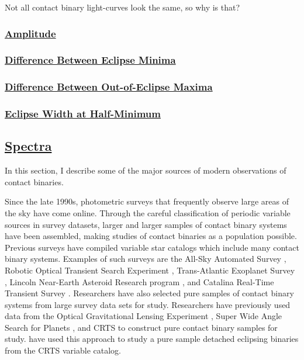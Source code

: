 \documentclass[12pt]{article} %
\numberwithin{equation}{section} %
\begin{document}
Not all contact binary light-curves look the same, so why is that?

\subsubsection[Amplitude]{\hyperlink{toc}{Amplitude}} \label{sec: Amplitude}

\subsubsection[Difference Between Eclipse Minima]{\hyperlink{toc}{Difference Between Eclipse Minima}} \label{sec: Difference Between Eclipse Minima}

\subsubsection[Difference Between Out-of-Eclipse Maxima]{\hyperlink{toc}{Difference Between Out-of-Eclipse Maxima}} \label{sec: Difference Between Out-of-Eclipse Maxima}

\subsubsection[Eclipse Width at Half-Minimum]{\hyperlink{toc}{Eclipse Width at Half-Minimum}} \label{sec: Eclipse Width at Half-Minimum}

\subsection[Spectra]{\hyperlink{toc}{Spectra}} \label{sec: Spectra}

In this section, I describe some of the major sources of modern observations of contact binaries. 

Since the late 1990s, photometric surveys that frequently observe large areas of the sky have come online. Through the careful classification of periodic variable sources in survey datasets, larger and larger samples of contact binary systems have been assembled, making studies of contact binaries as a population possible. Previous surveys have compiled variable star catalogs which include many contact binary systems. Examples of such surveys are the All-Sky Automated Survey \citep[ASAS,][]{pojmanski2000all}, Robotic Optical Transient Search Experiment \citep[ROTSE,][]{akerlof2000rotse}, Trans-Atlantic Exoplanet Survey \citep[TrES,][]{devor2008identification}, Lincoln Near-Earth Asteroid Research program \citep[LINEAR,][]{palaversa2013exploring}, and Catalina Real-Time Transient Survey \citep[CRTS,][]{drake2014catalina}. Researchers have also selected pure samples of contact binary systems from large survey data sets for study. Researchers have previously used data from the Optical Gravitational Lensing Experiment \citep[OGLE,][]{rucinski1996eclipsing}, Super Wide Angle Search for Planets \citep[SuperWASP,][]{norton2011short}, and CRTS \citep{drake2014ultra} to construct pure contact binary samples for study. \citet{lee2015properties} have used this approach to study a pure sample detached eclipsing binaries from the CRTS variable catalog. 
\end{document}
